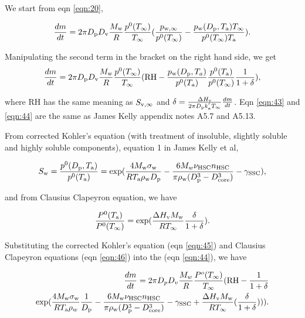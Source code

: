 \documentclass[12pt]{article}
\begin{document}
We start from eqn \ref{eqn:20}, 

\begin{equation}\label{eqn:43}
\frac{dm}{dt}=2 \pi D_{\rm p} D_{\rm v} \frac{M_{\rm w}}{R}  \frac{p^{\rm 0}(T_{\infty})} {T_{\infty}} (\frac{p_{\rm w, \infty}}{p^{0}(T_{\infty})} - \frac{p_{\rm w}(D_{\rm p}, T_{\rm a}) T_{\infty}}{p^{\rm 0}(T_{\infty}) T_{\rm a}}).
\end{equation}

Manipulating the second term in the bracket on the right hand side, we get
\begin{equation}\label{eqn:44}
\frac{dm}{dt}=2 \pi D_{\rm p} D_{\rm v}  \frac{M_{\rm w}}{R} \frac{p^{\rm 0}(T_{\infty})} {T_{\infty}} (\textrm{RH} - \frac{p_{\rm w}(D_{\rm p}, T_{a})}{p^{\rm 0}(T_{\rm a})} \frac{p^{\rm 0}(T_{\rm a})}{p^{\rm 0}(T_{\infty})}\frac{1}{1+\delta}),
\end{equation}

where RH has the same meaning as $S_{\rm v, \infty}$ and $\delta=\frac{\Delta H_{\rm v}}{2 \pi D_{\rm p} k^{'}_{\rm a} T_{\infty}} \frac{dm}{dt}$. Eqn \ref{eqn:43} and \ref{eqn:44} are the same as James Kelly appendix notes A5.7 and A5.13.

From corrected Kohler's  equation (with treatment of insoluble, slightly soluble and highly soluble components), equation 1  in James Kelly et al, 

\begin{equation}\label{eqn:45}
S_{\rm w}=\frac{p^{\rm 0}(D_{\rm p} ,T_{\rm a})} {p^{\rm 0}(T_{\rm a})} =\exp(\frac{4M_{\rm w}\sigma_{\rm w}}{RT_{\rm a}\rho_{\rm w}D_{\rm p}}-\frac{6M_{w}\nu_{\rm HSC}n_{\rm HSC}}{\pi \rho_{\rm w} (D_{\rm p}^{3}-D_{\rm core}^{3})}-\gamma_{\rm SSC}),
\end{equation}

and from Clausius Clapeyron equation, we have

\begin{equation}\label{eqn:46}
\frac{P^{\rm 0}(T_{\rm a})}{P^{\rm 0}(T_{\infty})}=\exp (\frac{\Delta H_{\rm v} M_{\rm w}}{R T_{\infty}} \frac{\delta}{1+\delta}).
\end{equation}
  
Substituting the corrected Kohler's equation (eqn \ref{eqn:45}) and Clausius Clapeyron equations (eqn \ref{eqn:46}) into the (eqn \ref{eqn:44}), we have

\begin{eqnarray}\label{eqn:47}
\frac{dm}{dt}=2 \pi D_{p} D_{v}  \frac{M_{w}}{R} \frac{P^{o}(T_{\infty})} {T_{\infty}} (\textrm{RH} - \frac{1}{1+\delta}  \\ \nonumber
\exp( \frac{4 M_{\rm w}\sigma_{\rm w}}{R T_{\rm a} \rho_w}\frac{1}{D_{\rm p}}-\frac{6M_{\rm w}\nu_{\rm HSC}n_{\rm HSC}}{\pi \rho_{\rm w}(D_{\rm p}^{3}-D_{\rm core}^{3})}-\gamma_{\rm SSC}+\frac{\Delta H_{\rm v} M_{\rm w}}{R T_{\infty}} (\frac{\delta}{1+\delta}))).  \nonumber
\end{eqnarray}
\end{document}

